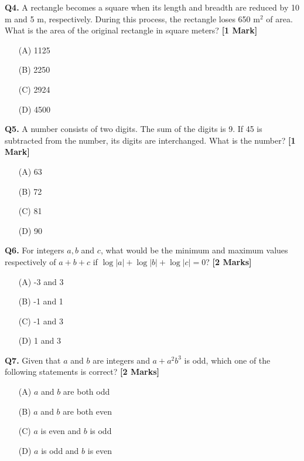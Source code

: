 \documentclass[11pt]{article}
\newcommand{\questiona}[2]{
    \noindent\textbf{Q#2.} #1 \hfill \textbf{[1 Mark]}
}
\newcommand{\questionb}[2]{
    \noindent\textbf{Q#2.} #1 \hfill \textbf{[2 Marks]}
}
\begin{document}
\questiona{A rectangle becomes a square when its length and breadth are reduced by 10 m and 5 m, respectively. During this process, the rectangle loses 650 m\(^2\) of area. What is the area of the original rectangle in square meters?}{4}
\begin{enumerate}
    \item[(A)] 1125  
    \item[(B)] 2250  
    \item[(C)] 2924  
    \item[(D)] 4500  
\end{enumerate}
\vspace{0.5cm}

\questiona{A number consists of two digits. The sum of the digits is 9. If 45 is subtracted from the number, its digits are interchanged. What is the number?}{5}
\begin{enumerate}
    \item[(A)] 63  
    \item[(B)] 72  
    \item[(C)] 81  
    \item[(D)] 90  
\end{enumerate}
\vspace{0.5cm}

\questionb{For integers \( a, b \) and \( c \), what would be the minimum and maximum values respectively of \( a + b + c \) if \( \log |a| + \log |b| + \log |c| = 0 \)?}{6}
\begin{enumerate}
    \item[(A)] -3 and 3  
    \item[(B)] -1 and 1  
    \item[(C)] -1 and 3  
    \item[(D)] 1 and 3  
\end{enumerate}
\vspace{0.5cm}

\questionb{Given that \( a \) and \( b \) are integers and \( a + a^2 b^3 \) is odd, which one of the following statements is correct?}{7}
\begin{enumerate}
    \item[(A)] \( a \) and \( b \) are both odd  
    \item[(B)] \( a \) and \( b \) are both even  
    \item[(C)] \( a \) is even and \( b \) is odd  
    \item[(D)] \( a \) is odd and \( b \) is even  
\end{enumerate}
\vspace{0.5cm}
\end{document}
